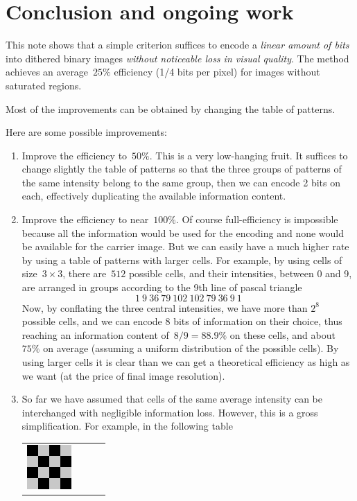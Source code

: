 \section{Conclusion and ongoing work}

This note shows that a simple criterion suffices to encode a \emph{linear
amount of bits} into dithered binary images \emph{without noticeable loss in
visual quality}.  The method achieves an average~$25\%$ efficiency (1/4 bits
per pixel) for images without saturated regions.

Most of the improvements can be obtained by changing the table of patterns.

Here are some possible improvements:

\begin{enumerate}
	\item Improve the efficiency to~$50\%$.  This is a very low-hanging
		fruit.  It suffices to change slightly the table of patterns
		so that the three groups of patterns of the same intensity
		belong to the same group, then we can encode 2 bits on each,
		effectively duplicating the available information content.
	\item Improve the efficiency to near~$100\%$.  Of course
		full-efficiency is impossible because all the information
		would be used for the encoding and none would be available
		for the carrier image.  But we can easily have a much higher
		rate by using a table of patterns with larger cells.  For
		example, by using cells of size~$3\times3$, there are~$512$
		possible cells, and their intensities, between 0 and 9, are
		arranged in groups according to the 9th line of pascal
		triangle
		$$
		1\ 9\ 36\ 79\ 102\ 102\ 79\ 36\ 9\ 1
		$$
		Now, by conflating the three central intensities, we have
		more than $2^8$ possible cells, and we can encode 8 bits of
		information on their choice, thus reaching an information
		content of~$8/9=88.9\%$ on these cells, and about~$75\%$ on
		average (assuming a uniform distribution of the possible
		cells).  By using larger cells it is clear than we can
		get a theoretical efficiency as high as we want (at the
		price of final image resolution).
	\item So far we have assumed that cells of the same average intensity
		can be interchanged with negligible information loss.
		However, this is a gross simplification.  For example, in the
		following table
		\begin{tabular}{llll}
			\includegraphics{pat4_a.png} &

\end{tabular}
\end{enumerate}
